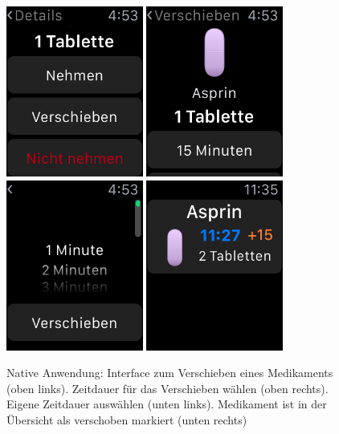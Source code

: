 \begin{figure}
	\caption{Native Anwendung: Interface zum Verschieben eines Medikaments (oben links). Zeitdauer für das Verschieben wählen (oben rechts). Eigene Zeitdauer auswählen (unten links). Medikament ist in der Übersicht als verschoben markiert (unten rechts) }
	\label{fig:watch-app-delay}
	\centering
	\includegraphics[width=0.4\textwidth]{04_realisation/screenshots/watch/delay01.png}
	\includegraphics[width=0.4\textwidth]{04_realisation/screenshots/watch/delay02.png}
	\includegraphics[width=0.4\textwidth]{04_realisation/screenshots/watch/delay03.png}
	\includegraphics[width=0.4\textwidth]{04_realisation/screenshots/watch/delay04.png}
\end{figure}


